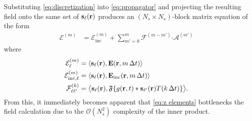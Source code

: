 Substituting \cref{eq:discretization} into \cref{eq:propagator} and projecting the resulting field onto the same set of $\vb{s}_\ell(\vb{r})$ produces an $(N_s \times N_s)$-block matrix equation of the form
\begin{equation}
  \begin{aligned}
    \mathcal{E}^{(m)} &= \mathcal{E}_\text{inc}^{(m)} + \sum_{m'= 0}^m \mathcal{F}^{(m - m')} \boldsymbol{\cdot} \mathcal{A}^{(m')}
  \end{aligned}
  \label{eq:mot}
\end{equation}
where
\begin{subequations}
  \begin{align}
    \mathcal{E}^{(m)}_\ell &= \langle \vb{s}_\ell(\vb{r}), \vb{E}(\vb{r}, m \, \Delta t) \rangle \label{eq:f elements}\\
    \mathcal{E}^{(m)}_{\text{inc},\ell} &= \langle \vb{s}_\ell(\vb{r}), \vb{E}_\text{inc}(\vb{r}, m \, \Delta t) \rangle \label{eq:l elements}\\
    \mathcal{F}^{(k)}_{\ell\ell'} &= \big\langle \vb{s}_\ell(\vb{r}), \mathfrak{F}\qty{g(\vb{r}, t) \ast \vb{s}_{\ell'}(\vb{r}) T(k \, \Delta t)} \big\rangle \label{eq:z elements}.
  \end{align}
\end{subequations}
From this, it immediately becomes apparent that \cref{eq:z elements} bottlenecks the field calculation due to the $\mathcal{O}(N_s^2)$ complexity of the inner product.


